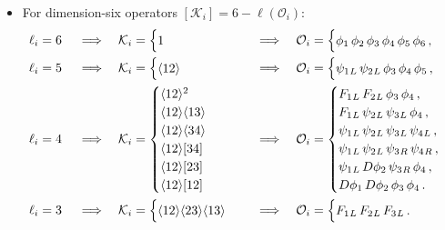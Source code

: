 \begin{itemize}
    \item For dimension-six operators $[\mathcal K_i] = 6 -\ell(\mathcal O_i)$:
    \begin{align}
        \ell_i &= 6
        &&
        \implies 
        &
        \mathcal K_i &=
        \begin{cases}
            1
        \end{cases} 
        &&
        \implies 
        &
        \mathcal O_i &=
        \begin{cases}
            \phi_1\, \phi_2\, \phi_3\, \phi_4\, \phi_5\, \phi_6\,,
        \end{cases}
         \\
        \ell_i &= 5
        &&
        \implies 
        &
        \mathcal K_i &=
        \begin{cases}
            \langle 1 2 \rangle
        \end{cases}
        &&
        \implies 
        &
        \mathcal O_i &=
        \begin{cases}
            \psi_1{}_L\,  \psi_2{}_L\,  \phi_3\,  \phi_4\,  \phi_5 \,,
        \end{cases}
        \\
        \ell_i &= 4
        &&
        \implies 
        &
        \mathcal K_i &= 
        \begin{cases}
            \langle 1 2 \rangle^2 \\
            \langle 1 2 \rangle\langle 1 3 \rangle\\
            \langle 1 2 \rangle\langle 3 4 \rangle\\
            \langle 1 2 \rangle\lbrack 3 4 \rbrack\\
            \langle 1 2 \rangle\lbrack 2 3 \rbrack \\
            \langle 1 2 \rangle\lbrack 1 2 \rbrack
        \end{cases}
        &&
        \implies 
        &
        \mathcal O_i &= 
        \begin{cases}
            F_1{}_L\,  F_2{}_L\,  \phi_3\,  \phi_4\,, \\
            F_1{}_L\,  \psi_2{}_L\,  \psi_3{}_L\,  \phi_4 \,,\\
            \psi_1{}_L\,  \psi_2{}_L\, \psi_3{}_L\,  \psi_4{}_L\,,\\
            \psi_1{}_L\,  \psi_2{}_L\, \psi_3{}_R\,  \psi_4{}_R\,,\\
            \psi_1{}_L\,  D\phi_2\,  \psi_3{}_R\,  \phi_4\,,\\
            D\phi_1\,  D\phi_2\,  \phi_3\,  \phi_4\,.
        \end{cases}
        \\
        \ell_i &= 3
        &&
        \implies 
        &
        \mathcal K_i &=
        \begin{cases}
            \langle 1 2 \rangle\langle 2 3 \rangle\langle 1 3 \rangle
        \end{cases}
        &&
        \implies 
        &
        \mathcal O_i &=
        \begin{cases}
            F_1{}_L\,  F_2{}_L\,  F_3{}_L\,.
        \end{cases}
    \end{align}
\end{itemize}
